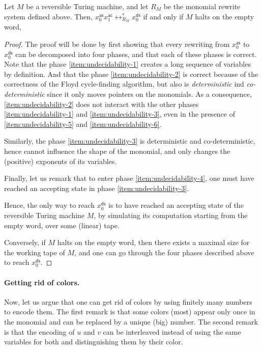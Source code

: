 \begin{lemma}
  \label{lem:undecidability}
  Let $M$ be a reversible Turing machine, and let $R_M$ be the monomial rewrite
  system defined above. Then, 
  $x_0^{\mathsf{as}} x_1^{\mathsf{ac}} \leftrightarrow_{R_M}^* x_0^{\mathsf{ds}}$ if and only if
  $M$ halts on the empty word,
\end{lemma}
\begin{proof}

  The proof will be done by first showing that every rewriting from
  $x_0^{\mathsf{as}}$ to $x_0^{\mathsf{ds}}$ can be decomposed into four
  phases, and that each of these phases is correct. Note that the phase
  \ref{item:undecidability-1} creates a long sequence of variables by
  definition. And that the phase \ref{item:undecidability-2} is correct because
  of the correctness of the Floyd cycle-finding algorithm, but also is
  \emph{deterministic} ind \emph{co-deterministic} since it only moves pointers
  on the monomials. As a consequence, \ref{item:undecidability-2} does not
  interact with the other phases \ref{item:undecidability-1} and
  \ref{item:undecidability-3}, even in the presence of
  \ref{item:undecidability-5} and \ref{item:undecidability-6}.

  Similarly, the phase \ref{item:undecidability-3} is deterministic and
  co-deterministic, hence cannot influence the shape of the monomial,
  and only changes the (positive) exponents of its variables.

  Finally, let us remark that to enter phase \ref{item:undecidability-4}, one
  must have reached an accepting state in phase \ref{item:undecidability-3}.

  Hence, the only way to reach $x_0^{\mathsf{ds}}$ is to have reached an accepting
  state of the reversible Turing machine $M$, by simulating its computation
  starting from the empty word, over some (linear) tape.

  Conversely, if $M$ halts on the empty word, then there exists a maximal
  size for the working tape of $M$, and one can go through the four phases
  described above to reach $x_0^{\mathsf{ds}}$.
\end{proof}

\paragraph{Getting rid of colors.}
Now, let us argue that one can get rid of colors by using 
finitely many numbers to encode them. 
The first remark is that some colors (most) appear only once 
in the monomial and can be replaced by a unique (big) number.
The second remark is that the encoding of $u$ and $v$ can be interleaved
instead of using the same variables for both and distinguishing them
by their color. 

